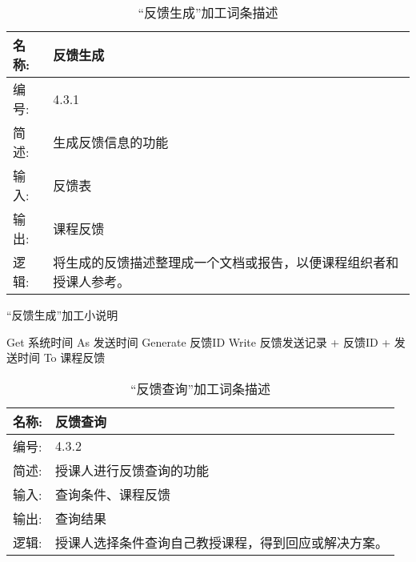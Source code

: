 \begin{table}[H]  
\caption{“反馈生成”加工词条描述}  
\begin{center}  
    \begin{tabular}{l p{11cm}} 
        \hline
        \quad 名称: & 反馈生成 \\
        \hline
        \quad 编号: & 4.3.1 \\
        \hline
        \quad 简述: & 生成反馈信息的功能 \\
        \hline
        \quad 输入: & 反馈表 \\
        \hline
        \quad 输出: & 课程反馈 \\
        \hline
        \quad 逻辑: & 将生成的反馈描述整理成一个文档或报告，以便课程组织者和授课人参考。 \\
        \hline
    \end{tabular}
    \label{tab1}
\end{center}
\end{table}


\begin{algorithm}[H]
    \renewcommand{\thealgorithm}{}
    \caption{“反馈生成”加工小说明} 
    \label{alg3} 
    \begin{algorithmic}[1]
        \STATE Get 系统时间 As 发送时间
        \STATE Generate 反馈ID 
        \STATE Write 反馈发送记录 + 反馈ID + 发送时间 To 课程反馈
    \end{algorithmic} 
\end{algorithm}

\begin{table}[H]  
\caption{“反馈查询”加工词条描述}  
\begin{center}  
    \begin{tabular}{l p{11cm}} 
        \hline
        \quad 名称: & 反馈查询 \\
        \hline
        \quad 编号: & 4.3.2 \\
        \hline
        \quad 简述: & 授课人进行反馈查询的功能 \\
        \hline
        \quad 输入: & 查询条件、课程反馈 \\
        \hline
        \quad 输出: & 查询结果 \\
        \hline
        \quad 逻辑: & 授课人选择条件查询自己教授课程，得到回应或解决方案。 \\
        \hline
    \end{tabular}
    \label{tab1}
\end{center}
\end{table}


